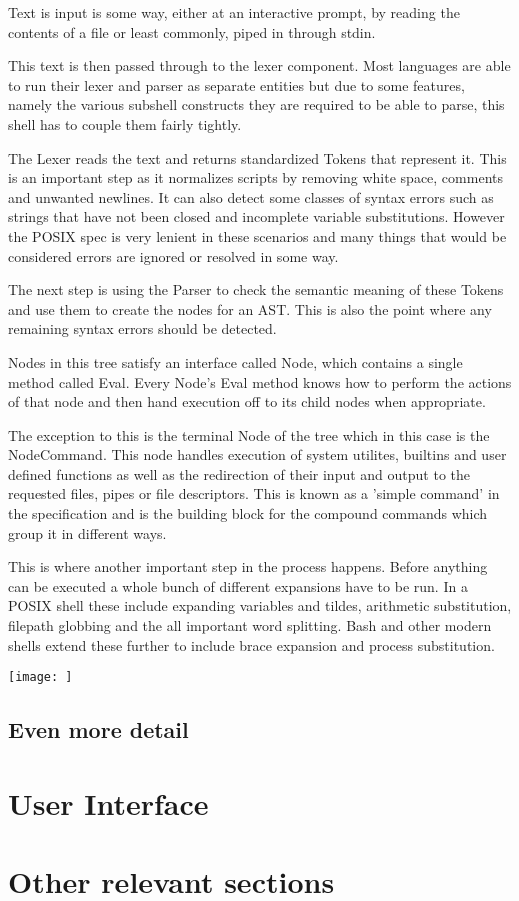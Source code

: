 Text is input is some way, either at an interactive prompt, by reading the contents of a file or least commonly, piped in through stdin.

This text is then passed through to the lexer component.
Most languages are able to run their lexer and parser as separate entities but due to some  features, namely the various subshell constructs they are required to be able to parse, this shell has to couple them fairly tightly.

The Lexer reads the text and returns standardized Tokens that represent it.
This is an important step as it normalizes scripts by removing white space, comments and unwanted newlines.
It can also detect some classes of syntax errors such as strings that have not been closed and incomplete variable substitutions.
However the POSIX spec is very lenient in these scenarios and many things that would be considered errors are ignored or resolved in some way. %

The next step is using the Parser to check the semantic meaning of these Tokens and use them to create the nodes for an AST.
This is also the point where any remaining syntax errors should be detected.

Nodes in this tree satisfy an interface called Node, which contains a single method called Eval.
Every Node's Eval method knows how to perform the actions of that node and then hand execution off to its child nodes when appropriate.

The exception to this is the terminal Node of the tree which in this case is the NodeCommand.
This node handles execution of system utilites, builtins and user defined functions as well as the redirection of their input and output to the requested files, pipes or file descriptors.
This is known as a 'simple command' in the specification and is the building block for the compound commands which group it in different ways.

This is where another important step in the process happens.
Before anything can be executed a whole bunch of different expansions have to be run. In a POSIX shell these include expanding variables and tildes, arithmetic substitution, filepath globbing and the all important word splitting.
Bash and other modern shells extend these further to include brace expansion and process substitution.

\texttt{[image: ]}

\subsection{Even more detail}

\section{User Interface}

\section{Other relevant sections}